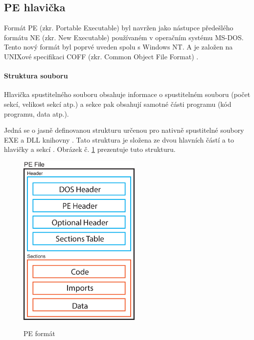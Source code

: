 \subsection{PE hlavička}
\label{pe_format}



Formát PE (zkr. Portable Executable) byl navržen jako nástupce předešlého formátu NE (zkr. New Executable) používaném v operačním systému MS-DOS. Tento nový formát byl poprvé uveden spolu s Windows NT. A je založen na UNIXové specifikaci COFF (zkr. Common Object File Format) \cite{pe_format_history}.

\paragraph*{Struktura souboru}

Hlavička spustitelného souboru obsahuje informace o spustitelném souboru (počet sekcí, velikost sekcí atp.) a sekce pak obsahují samotné části programu (kód programu, data atp.).

Jedná se o jasně definovanou strukturu určenou pro nativně spustitelné soubory EXE a DLL knihovny \cite{Zatloukal2017MalwareDB}. Tato struktura je složena ze dvou hlavních částí a to hlavičky a sekcí \cite{msdocs_pe}. Obrázek č. \ref{fig:peformat} prezentuje tuto strukturu.

\begin{figure}[!ht]
    \centering
    \caption{PE formát}
    \includegraphics[width=60mm,scale=0.5]{Figures/obrazky/pe-file.eps}
    \label{fig:peformat}
\end{figure}


